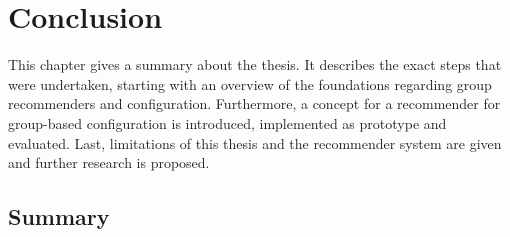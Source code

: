 \chapter{Conclusion}
\label{ch:Conclusion}

This chapter gives a summary about the thesis. It describes the exact steps that were undertaken, starting with an overview of the foundations regarding group recommenders and configuration. Furthermore, a concept for a recommender for group-based configuration is introduced, implemented as prototype and evaluated. Last, limitations of this thesis and the recommender system are given and further research is proposed.

\section{Summary}
\label{sec:Conclusion:Summary}



